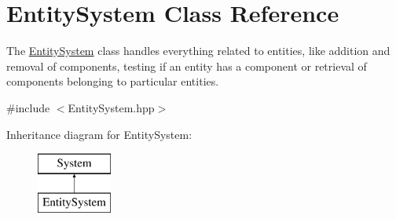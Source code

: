 \hypertarget{class_entity_system}{}\section{Entity\+System Class Reference}
\label{class_entity_system}


The \hyperlink{class_entity_system}{Entity\+System} class handles everything related to entities, like addition and removal of components, testing if an entity has a component or retrieval of components belonging to particular entities.  




{\ttfamily \#include $<$Entity\+System.\+hpp$>$}

Inheritance diagram for Entity\+System\+:\begin{figure}[H]
\begin{center}
\leavevmode
\includegraphics[height=2.000000cm]{class_entity_system}
\end{center}
\end{figure}

